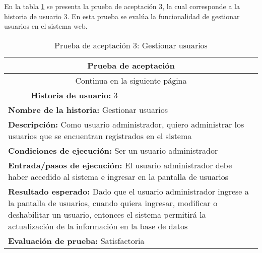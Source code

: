 En la tabla \ref{tab:prueba-3} se presenta la prueba de aceptación 3, la cual corresponde a la historia de usuario 3.
En esta prueba se evalúa la funcionalidad de gestionar usuarios en el sistema web.

\begin{longtable}{|p{6.7cm}|p{6.7cm}|}
    \caption{Prueba de aceptación 3: Gestionar usuarios} \label{tab:prueba-3}
    \\
    \hline
    \multicolumn{2}{|c|}{\textbf{Prueba de aceptación}}                                                                                                              \\
    \hline

    \endfirsthead

    \hline
    \endhead

    \hline
    \multicolumn{2}{|c|}{{Continua en la siguiente página}}                                                                                                          \\
    \hline
    \endfoot

    \hline
    \endlastfoot
    \multicolumn{1}{|p{6.7cm}|}{\textbf{Número} 3 } & \multicolumn{1}{|p{6.7cm}|}{\textbf{Historia de usuario:} 3}                                                   \\
    \hline
    \multicolumn{2}{|p{13.4cm}|}{\textbf{Nombre de la historia:} Gestionar usuarios }                                                                                \\
    \hline
    \multicolumn{2}{|p{13.4cm}|}{\textbf{Descripción:} Como usuario administrador, quiero administrar los usuarios que se encuentran registrados en el sistema}      \\
    \hline
    \multicolumn{2}{|p{13.4cm}|}{\textbf{Condiciones de ejecución:} Ser un usuario administrador}                                                                    \\
    \hline
    \multicolumn{2}{|p{13.4cm}|}{\textbf{Entrada/pasos de ejecución:} El usuario administrador debe haber accedido al sistema e ingresar en la pantalla de usuarios} \\
    \hline
    \multicolumn{2}{|p{13.4cm}|}{\textbf{Resultado esperado:} Dado que el usuario administrador ingrese a la pantalla de usuarios, cuando quiera ingresar,
    modificar o deshabilitar un usuario, entonces el sistema permitirá la actualización de la información en la base de datos}                                       \\
    \hline
    \multicolumn{2}{|p{13.4cm}|}{\textbf{Evaluación de prueba:} Satisfactoria}                                                                                       \\
    \hline
\end{longtable}

